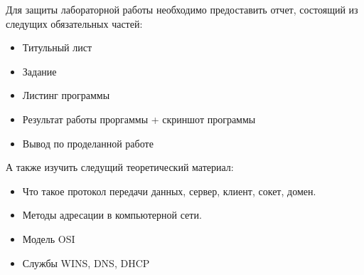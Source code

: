 \documentclass[a4paper,12pt]{article}
\begin{document}
  \begin{flushleft}

  Для защиты лабораторной работы необходимо предоставить отчет, состоящий из следущих обязательных частей:
  \begin{itemize}
   \item Титульный лист
   \item Задание
   \item Листинг программы
   \item Результат работы проргаммы + скриншот программы
   \item Вывод по проделанной работе
  \end{itemize}



  А также изучить следущий теоретический материал:
  \begin{itemize}
   \item Что такое протокол передачи данных, сервер, клиент, сокет, домен.
   \item Методы адресации в компьютерной сети.
   \item Модель OSI
   \item Службы WINS, DNS, DHCP
  \end{itemize}
  \end{flushleft}

  
\end{document}
